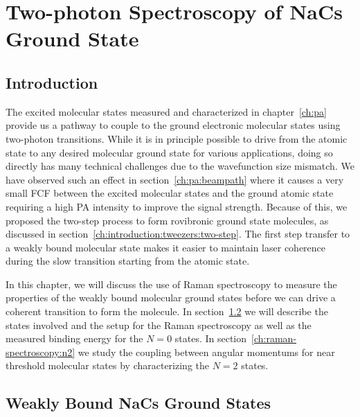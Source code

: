 
\chapter{Two-photon Spectroscopy of NaCs Ground State}
\label{ch:raman-spectroscopy}

\section{Introduction}
\label{ch:raman-spectroscopy:introduction}

The excited molecular states measured and characterized in chapter~\ref{ch:pa}
provide us a pathway to couple to the ground electronic molecular states
using two-photon transitions.
While it is in principle possible to drive from the atomic state
to any desired molecular ground state for various applications,
doing so directly has many technical challenges due to the wavefunction size mismatch.
We have observed such an effect in section~\ref{ch:pa:beampath}
where it causes a very small FCF between the excited molecular states
and the ground atomic state requiring a high PA intensity to improve the signal strength.
Because of this, we proposed the two-step process to form rovibronic ground state molecules,
as discussed in section~\ref{ch:introduction:tweezers:two-step}.
The first step transfer to a weakly bound molecular state makes it easier
to maintain laser coherence during the slow transition starting from the atomic state.

In this chapter, we will discuss the use of Raman spectroscopy
to measure the properties of the weakly bound molecular ground states
before we can drive a coherent transition to form the molecule.
In section~\ref{ch:raman-spectroscopy:states}
we will describe the states involved and the setup for the Raman spectroscopy
as well as the measured binding energy for the $N=0$ states.
In section~\ref{ch:raman-spectroscopy:n2}
we study the coupling between angular momentums for near threshold molecular states
by characterizing the $N=2$ states.

\section{Weakly Bound NaCs Ground States}
\label{ch:raman-spectroscopy:states}

